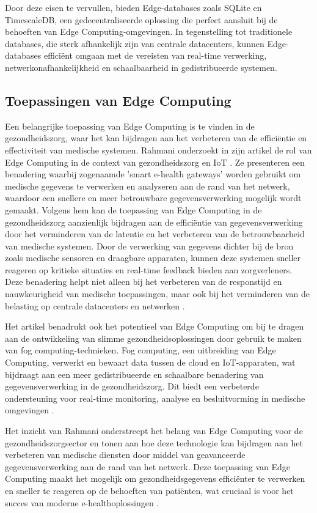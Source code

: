 Door deze eisen te vervullen, bieden Edge-databases zoals SQLite en TimescaleDB, een gedecentraliseerde oplossing die perfect aansluit bij de behoeften van Edge Computing-omgevingen. In tegenstelling tot traditionele databases, die sterk afhankelijk zijn van centrale datacenters, kunnen Edge-databases efficiënt omgaan met de vereisten van real-time verwerking, netwerkonafhankelijkheid en schaalbaarheid in gedistribueerde systemen.


\subsection{Toepassingen van Edge Computing}

Een belangrijke toepassing van Edge Computing is te vinden in de gezondheidszorg, waar het kan bijdragen aan het verbeteren van de efficiëntie en effectiviteit van medische systemen. Rahmani onderzoekt in zijn artikel de rol van Edge Computing in de context van gezondheidszorg en IoT \autocite{Rahmani2018}.
 Ze presenteren een benadering waarbij zogenaamde 'smart e-health gateways' worden gebruikt om medische gegevens te verwerken en analyseren aan de rand van het netwerk, waardoor een snellere en meer betrouwbare gegevensverwerking mogelijk wordt gemaakt.
Volgens hem kan de toepassing van Edge Computing in de gezondheidszorg aanzienlijk bijdragen aan de efficiëntie van gegevensverwerking door het verminderen van de latentie en het verbeteren van de betrouwbaarheid van medische systemen. 
 Door de verwerking van gegevens dichter bij de bron zoals medische sensoren en draagbare apparaten, kunnen deze systemen sneller reageren op kritieke situaties en real-time feedback bieden aan zorgverleners.
Deze benadering helpt niet alleen bij het verbeteren van de responstijd en nauwkeurigheid van medische toepassingen, maar ook bij het verminderen van de belasting op centrale datacenters en netwerken \autocite{Rahmani2018}.
 
Het artikel benadrukt ook het potentieel van Edge Computing om bij te dragen aan de ontwikkeling van slimme gezondheidsoplossingen door gebruik te maken van fog computing-technieken. 
 Fog computing, een uitbreiding van Edge Computing, verwerkt en bewaart data tussen de cloud en IoT-apparaten, wat bijdraagt aan een meer gedistribueerde en schaalbare benadering van gegevensverwerking in de gezondheidszorg.
Dit biedt een verbeterde ondersteuning voor real-time monitoring, analyse en besluitvorming in medische omgevingen \autocite{Rahmani2018}.
 
Het inzicht van Rahmani onderstreept het belang van Edge Computing voor de gezondheidszorgsector en tonen aan hoe deze technologie kan bijdragen aan het verbeteren van medische diensten door middel van geavanceerde gegevensverwerking aan de rand van het netwerk.
 Deze toepassing van Edge Computing maakt het mogelijk om gezondheidsgegevens efficiënter te verwerken en sneller te reageren op de behoeften van patiënten, wat cruciaal is voor het succes van moderne e-healthoplossingen \autocite{Rahmani2018}.
 
